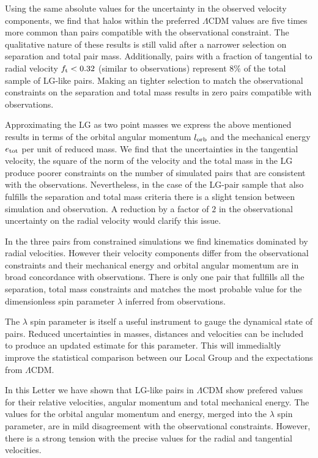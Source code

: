 \documentclass{emulateapj}
\begin{document}
Using the same absolute values for the uncertainty in the observed velocity components, we find that halos within the preferred $\Lambda$CDM values are five times more common than pairs compatible with the observational constraint.  The qualitative nature of these results is still valid after a narrower selection on separation and total pair mass. Additionally, pairs with a fraction of tangential to radial velocity $f_{\rm t}<0.32$ (similar to observations) represent $8\%$ of the total sample of LG-like pairs. Making an tighter selection to match the observational constraints on the separation and total mass results in zero pairs compatible with observations.

Approximating the LG as two point masses we express the above mentioned results in terms of the orbital angular momentum $l_{\rm orb}$ and the mechanical energy $e_{\rm tot}$ per unit of reduced mass. We find that the uncertainties in the tangential velocity, the square of the norm of the velocity and the total mass in the LG produce poorer constraints on the number of simulated pairs that are consistent with the observations. Nevertheless, in the case of the LG-pair sample that also fulfills the separation and total mass criteria there is a slight tension between simulation and observation. A reduction by a factor of $2$ in the observational uncertainty on the radial velocity would clarify this issue.

In the three pairs from constrained simulations we find kinematics dominated by radial velocities. However their velocity components differ from the observational constraints and their mechanical energy and orbital angular momentum are in broad concordance with observations. There is only one pair that fullfills all the separation, total mass constraints and matches the most probable value for the dimensionless spin parameter $\lambda$ inferred from observations. 

The $\lambda$ spin parameter is itself a useful instrument to gauge the dynamical state of pairs. Reduced uncertainties in masses, distances and velocities can be included to produce an updated estimate for this parameter. This will immedialtly improve the statistical comparison between our Local Group and the expectations from $\Lambda$CDM.

In this Letter we have shown that LG-like pairs in $\Lambda$CDM show prefered values for their relative velocities, angular momentum and total mechanical energy. The values for the orbital angular momentum and energy, merged into the $\lambda$ spin parameter, are in mild disagreement with the observational constraints. However, there is a strong tension with the precise values for the radial and tangential velocities.
\end{document}
